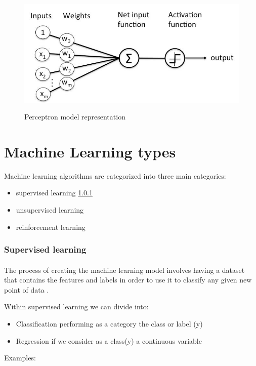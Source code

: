 \begin{figure}[ht]
    \centering
    \includegraphics[scale=0.6]{figures/general-diagram-of-perceptron-for-supervised-learning_4.jpg}
    \caption{Perceptron model representation}
    \label{fig:PercMR}
    \citet{perc}
\end{figure}




\section{Machine Learning types}
Machine learning algorithms are
categorized into three main categories:
\begin{itemize}
\item supervised learning \ref{SL}
\item unsupervised learning
\item reinforcement learning
\end{itemize}

\subsubsection{Supervised learning}\label{SL}

\paragraph{}The process of creating the machine learning model involves having a dataset that contains the features and labels in order to use it to classify any given new point of data \citet{Burkov2020}.

Within supervised learning we can divide into: 
\begin{itemize}
    \item  Classification performing as a category the class or label (y)
    \item Regression if we consider as a class(y) a continuous variable
\end{itemize}   
 Examples: 
 
